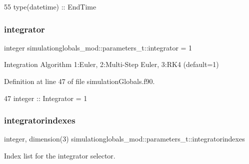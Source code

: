 \begin{DoxyCode}
55         \textcolor{keywordtype}{type}(datetime)  :: EndTime
\end{DoxyCode}
\mbox{\label{structsimulationglobals__mod_1_1parameters__t_a1489379b1bb839280c0715470250c9f5}} 
\subsubsection{\texorpdfstring{integrator}{integrator}}
{\footnotesize\ttfamily integer simulationglobals\+\_\+mod\+::parameters\+\_\+t\+::integrator = 1\hspace{0.3cm}{\ttfamily [private]}}



Integration Algorithm 1\+:Euler, 2\+:Multi-\/\+Step Euler, 3\+:R\+K4 (default=1) 



Definition at line 47 of file simulation\+Globals.\+f90.


\begin{DoxyCode}
47         \textcolor{keywordtype}{integer}         :: Integrator = 1
\end{DoxyCode}
\mbox{\label{structsimulationglobals__mod_1_1parameters__t_adf4a0c840f5b357417f8c729f33c6428}} 
\subsubsection{\texorpdfstring{integratorindexes}{integratorindexes}}
{\footnotesize\ttfamily integer, dimension(3) simulationglobals\+\_\+mod\+::parameters\+\_\+t\+::integratorindexes\hspace{0.3cm}{\ttfamily [private]}}



Index list for the integrator selector. 



